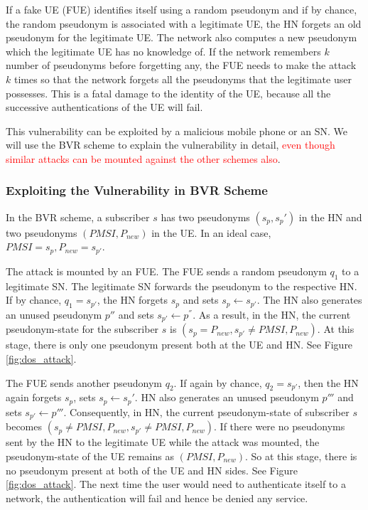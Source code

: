 \documentclass{llncs} %
\begin{document}
If a fake UE (FUE) identifies itself using a random pseudonym and if by chance, the random pseudonym is associated with a legitimate UE, the HN forgets an old pseudonym for the legitimate UE. The network also computes a new pseudonym which the legitimate UE has no knowledge of. If the network remembers  $k$ number of pseudonyms before forgetting any, the FUE needs to make the attack $k$ times so that the network forgets all the pseudonyms that the legitimate user possesses. This is a fatal damage to the identity of the UE, because all the successive authentications of the UE will fail. 

This vulnerability can be exploited by a malicious mobile phone or an SN. We will use the BVR scheme to explain the vulnerability in detail, \textcolor{red}{even though similar attacks can be mounted against the other schemes also}.


\subsubsection{Exploiting the Vulnerability in BVR Scheme}
In the BVR scheme, a subscriber $s$ has two pseudonyms $\left(s_p,s_p'\right)$ in the HN and two pseudonyms $\left(PMSI,P_{new}\right)$ in the UE. In an ideal case, $PMSI = s_p, P_{new} = s_{p'}$. 

The attack is mounted by an FUE. The FUE sends a random pseudonym $q_1$ to a legitimate SN. The legitimate SN forwards the pseudonym to the respective HN. If by chance, $q_1 = s_{p'}$, the HN forgets $s_p$ and sets $s_p \leftarrow s_{p'}$. The HN also generates an unused pseudonym ${p''}$ and sets $s_{p'} \leftarrow p^{''}$. As a result, in the HN, the current  pseudonym-state for the subscriber $s$ is $\left(s_{p} = P_{new},s_{p'} \neq PMSI,P_{new}\right)$. At this stage, there is only one pseudonym present both at the UE and HN. See Figure \ref{fig:dos_attack}.

The FUE sends another pseudonym $q_2$. If again by chance, $q_2 = s_{p'}$, then the HN again forgets $s_{p}$, sets $s_p \leftarrow s_p'$. HN also generates an unused pseudonym $p'''$ and sets $s_{p'} \leftarrow p'''$. Consequently, in HN, the current pseudonym-state of subscriber $s$ becomes $\left(s_{p} \neq PMSI,P_{new},s_{p'} \neq PMSI,P_{new}\right)$. If there were no pseudonyms sent by the HN to the legitimate UE while the attack was mounted, the pseudonym-state of the UE remains as $\left(PMSI,P_{new}\right)$. So at this stage, there is no pseudonym present at both of the UE and HN sides. See Figure \ref{fig:dos_attack}. The next time the user would need to authenticate itself to a network, the authentication will fail and hence be denied any service.
\end{document}
